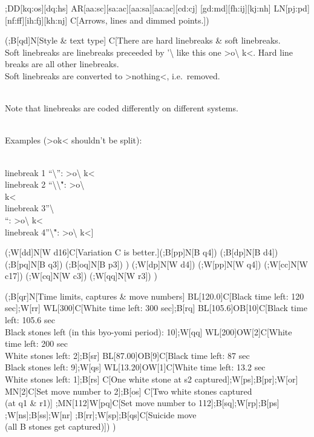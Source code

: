 ;DD{[}kq:os{]}{[}dq:hs{]}
AR{[}aa:sc{]}{[}sa:ac{]}{[}aa:sa{]}{[}aa:ac{]}{[}cd:cj{]}
{[}gd:md{]}{[}fh:ij{]}{[}kj:nh{]}
LN{[}pj:pd{]}{[}nf:ff{]}{[}ih:fj{]}{[}kh:nj{]} C{[}Arrows, lines and
dimmed points.{]})

(;B{[}qd{]}N{[}Style \& text type{]} C{[}There are hard linebreaks \&
soft linebreaks.\\
Soft linebreaks are linebreaks preceeded by
'\textbackslash\textquotesingle{} like this one
\textgreater o\textbackslash{} k\textless. Hard line breaks are all
other linebreaks.\\
Soft linebreaks are converted to \textgreater nothing\textless,
i.e.~removed.\\
\strut \\
Note that linebreaks are coded differently on different systems.\\
\strut \\
Examples (\textgreater ok\textless{} shouldn't be split):\\
\strut \\
linebreak 1 ``\textbackslash{}\n'': \textgreater o\textbackslash{}
k\textless{}\\
linebreak 2 ``\textbackslash{}\n\textbackslash{}\r":
\textgreater o\textbackslash{}\\
k\textless{}\\
linebreak 3''\textbackslash{}\r\\\n``: \textgreater o\textbackslash{}
k\textless{}\\
linebreak 4''\textbackslash{}\r": \textgreater o\textbackslash{}
k\textless{]}

(;W{[}dd{]}N{[}W d16{]}C{[}Variation C is better.{]}(;B{[}pp{]}N{[}B
q4{]}) (;B{[}dp{]}N{[}B d4{]}) (;B{[}pq{]}N{[}B q3{]}) (;B{[}oq{]}N{[}B
p3{]}) ) (;W{[}dp{]}N{[}W d4{]}) (;W{[}pp{]}N{[}W q4{]})
(;W{[}cc{]}N{[}W c17{]}) (;W{[}cq{]}N{[}W c3{]}) (;W{[}qq{]}N{[}W r3{]})
)

(;B{[}qr{]}N{[}Time limits, captures \& move numbers{]}
BL{[}120.0{]}C{[}Black time left: 120 sec{]};W{[}rr{]}
WL{[}300{]}C{[}White time left: 300 sec{]};B{[}rq{]}
BL{[}105.6{]}OB{[}10{]}C{[}Black time left: 105.6 sec\\
Black stones left (in this byo-yomi period): 10{]};W{[}qq{]}
WL{[}200{]}OW{[}2{]}C{[}White time left: 200 sec\\
White stones left: 2{]};B{[}sr{]} BL{[}87.00{]}OB{[}9{]}C{[}Black time
left: 87 sec\\
Black stones left: 9{]};W{[}qs{]} WL{[}13.20{]}OW{[}1{]}C{[}White time
left: 13.2 sec\\
White stones left: 1{]};B{[}rs{]} C{[}One white stone at s2
captured{]};W{[}ps{]};B{[}pr{]};W{[}or{]} MN{[}2{]}C{[}Set move number
to 2{]};B{[}os{]} C{[}Two white stones captured\\
(at q1 \& r1){]} ;MN{[}112{]}W{[}pq{]}C{[}Set move number to
112{]};B{[}sq{]};W{[}rp{]};B{[}ps{]} ;W{[}ns{]};B{[}ss{]};W{[}nr{]}
;B{[}rr{]};W{[}sp{]};B{[}qs{]}C{[}Suicide move\\
(all B stones get captured){]}) )

